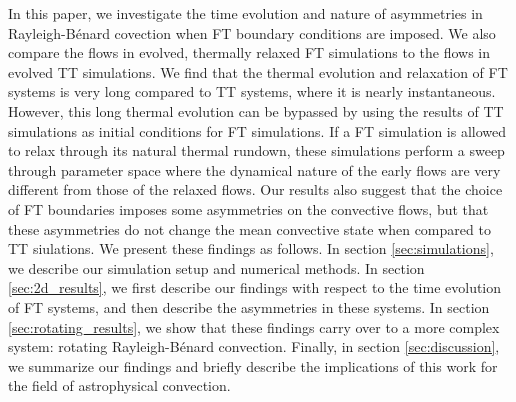 \documentclass[aps, pre, onecolumn, nofootinbib, notitlepage, groupedaddress, amsfonts, amssymb, amsmath, longbibliography, superscriptaddress]{revtex4-1}
\newcommand{\RB}{Rayleigh-B\'{e}nard }
\begin{document}
In this paper, we investigate the time evolution and nature of asymmetries in \RB covection when FT boundary conditions are imposed.
We also compare the flows in evolved, thermally relaxed FT simulations to the flows in evolved TT simulations.
We find that the thermal evolution and relaxation of FT systems is very long compared to TT systems, where it is nearly instantaneous.
However, this long thermal evolution can be bypassed by using the results of TT simulations as initial conditions for FT simulations.
If a FT simulation is allowed to relax through its natural thermal rundown, these simulations perform a sweep through parameter space where the dynamical nature of the early flows are very different from those of the relaxed flows.
Our results also suggest that the choice of FT boundaries imposes some asymmetries on the convective flows, but that these asymmetries do not change the mean convective state when compared to TT siulations.
We present these findings as follows.
In section \ref{sec:simulations}, we describe our simulation setup and numerical methods.
In section \ref{sec:2d_results}, we first describe our findings with respect to the time evolution of FT systems, and then describe the asymmetries in these systems.
In section \ref{sec:rotating_results}, we show that these findings carry over to a more complex system: rotating \RB convection.
Finally, in section \ref{sec:discussion}, we summarize our findings and briefly describe the implications of this work for the field of astrophysical convection.

\end{document}
